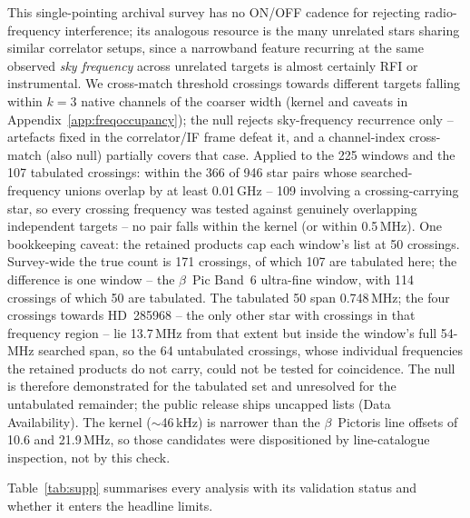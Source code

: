 \documentclass{openjournal}
\begin{document}
This single-pointing archival survey has no ON/OFF cadence for
rejecting radio-frequency interference; its analogous resource is the
many unrelated stars sharing similar correlator setups, since a
narrowband feature recurring at the same observed \emph{sky
frequency} across unrelated targets is almost certainly RFI or
instrumental. We cross-match threshold crossings towards different
targets falling within $k=3$ native channels of the coarser width
(kernel and caveats in Appendix~\ref{app:freqoccupancy}); the null
rejects sky-frequency recurrence only -- artefacts fixed in the
correlator/IF frame defeat it, and a channel-index cross-match (also
null) partially covers that case. Applied to the 225 windows and the
107 tabulated crossings: within the 366 of 946 star pairs whose
searched-frequency unions overlap by at least 0.01\,GHz -- 109
involving a crossing-carrying star, so every crossing frequency was
tested against genuinely overlapping independent targets -- no pair
falls within the kernel (or within 0.5\,MHz). One bookkeeping caveat:
the retained products cap each window's list at 50 crossings.
Survey-wide the true count is 171 crossings, of which 107 are
tabulated here; the difference is one window -- the $\beta$~Pic
Band~6 ultra-fine window, with 114 crossings of which 50 are
tabulated. The tabulated 50 span 0.748\,MHz; the four crossings
towards HD~285968 -- the only other star with crossings in that
frequency region -- lie 13.7\,MHz from that extent but inside the
window's full 54-MHz searched span, so the 64 untabulated crossings,
whose individual frequencies the retained products do not carry,
could not be tested for coincidence. The null is therefore
demonstrated for the tabulated set and unresolved for the untabulated
remainder; the public release ships uncapped lists (Data
Availability). The kernel ($\sim$46\,kHz) is narrower than the
$\beta$~Pictoris line offsets of 10.6 and 21.9\,MHz, so those
candidates were dispositioned by line-catalogue inspection, not by
this check.

Table~\ref{tab:supp} summarises every analysis with its validation
status and whether it enters the headline limits.
\end{document}
